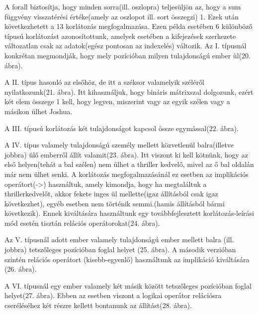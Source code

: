 \documentclass[12pt,a4paper,twoside, openright]{report}
\begin{document}

    A forall biztosítja, hogy minden sorra(ill. oszlopra) teljesüljön az, hogy a sum függvény visszatérési értéke(amely az oszlopot ill. sort összegzi) 1.
    Ezek után következhetett a 13 korlátozás megfogalmazása.
    Ezen példa esetében 6 különböző típusú korlátozást azonosítottunk, amelyek esetében a kifejezések szerkezete változatlan csak az adatok(egész pontosan az indexelés) változik.
    Az I. típusnál konkrétan megmondják, hogy mely pozícióban milyen tulajdonságú ember ül(20. ábra).


    A II. típus hasonló az elsőhöz, de itt a széksor valamelyik széléről nyilatkozunk(21. ábra).
    Itt kihasználjuk, hogy bináris mátrixszal dolgozunk, ezért két elem összege 1 kell, hogy legyen, miszerint vagy az egyik szélen vagy a másikon ülhet Joshua.


    A III. típusú korlátozás két tulajdonságot kapcsol össze egymással(22. ábra).


    A IV. típus valamely tulajdonságú személy mellett közvetlenül balra(illetve jobbra) ülő emberről állít valamit(23. ábra).
    Itt viszont ki kell kötnünk, hogy az első helyen(tehát a bal szélen) nem ülhet a thriller kedvelő, mivel az ő bal oldalán már nem ülhet senki.
    A korlátozás megfogalmazásánál ez esetben az implikációs operátort(->) használtuk, amely kimondja, hogy ha megtaláltuk a thrillerkedvelőt, akkor fekete inges ül mellette(igaz állításból csak igaz következhet), egyéb esetben nem történik semmi.(hamis állításból bármi következik).
    Ennek kiváltására használtunk egy továbbfejlesztett korlátozás-leírási mód esetén tisztán relációs operátorokat(24. ábra).


    Az V. típusnál adott ember valamely tulajdonságú ember mellett balra (ill. jobbra) tetszőleges pozícióban foglal helyet (25. ábra).
    A második verzióban szintén relációs operátort (kisebb-egyenlő) használtunk az implikáció kiváltására (26. ábra).


    A VI. típusnál egy ember valamely két másik között tetszőleges pozícióban foglal helyet(27. ábra).
    Ebben az esetben viszont a logikai operátor relációsra cseréléséhez két részre kellett bontanunk az állítást(28. ábra).

\end{document}
